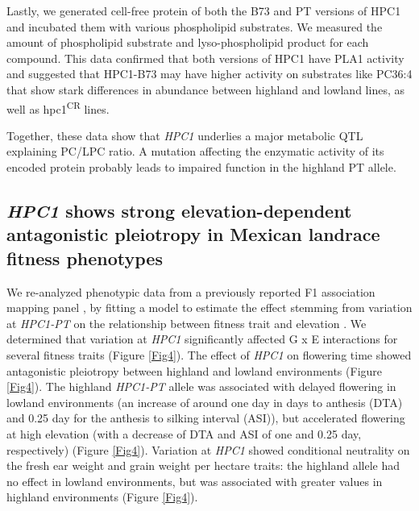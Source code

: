 \documentclass[9pt,twocolumn,twoside,lineno]{biorxiv}
\begin{document}
Lastly, we generated cell-free protein of both the B73 and PT versions of HPC1 and incubated them with various phospholipid substrates. 
We measured the amount of phospholipid substrate and lyso-phospholipid product for each compound. 
This data confirmed that both versions of HPC1 have PLA1 activity and suggested that HPC1-B73 may have higher activity on substrates like PC36:4 that show stark differences in abundance between highland and lowland lines, as well as hpc1\textsuperscript{CR} lines.

Together, these data show that \textit{HPC1} underlies a major metabolic QTL explaining PC/LPC ratio. A mutation affecting the enzymatic activity of its encoded protein probably leads to impaired function in the highland PT allele.  

\subsection{\textit{HPC1} shows strong elevation-dependent antagonistic pleiotropy in Mexican landrace fitness phenotypes} 
We re-analyzed phenotypic data from a previously reported F1 association mapping panel \cite{Romero_Navarro2017-cn, Gates2019-xu}, by fitting a model to estimate the effect stemming from variation at \textit{HPC1-PT} on the relationship between fitness trait and elevation \cite{Runcie2019-Gr}. 
We determined that variation at \textit{HPC1} significantly affected G x E interactions for several fitness traits (Figure \ref{Fig4}). 
The effect of \textit{HPC1} on flowering time showed antagonistic pleiotropy between highland and lowland environments (Figure \ref{Fig4}). 
The highland \textit{HPC1-PT} allele was associated with delayed flowering in lowland environments (an increase of around one day in days to anthesis (DTA)  and 0.25 day for the  anthesis to silking interval (ASI)), but accelerated flowering at high elevation (with a decrease of DTA and ASI of one and 0.25 day, respectively) (Figure \ref{Fig4}).
Variation at \textit{HPC1} showed conditional neutrality on the fresh ear weight and grain weight per hectare traits: the highland allele had no effect in lowland environments, but was associated with greater values in highland environments (Figure \ref{Fig4}).
\end{document}
